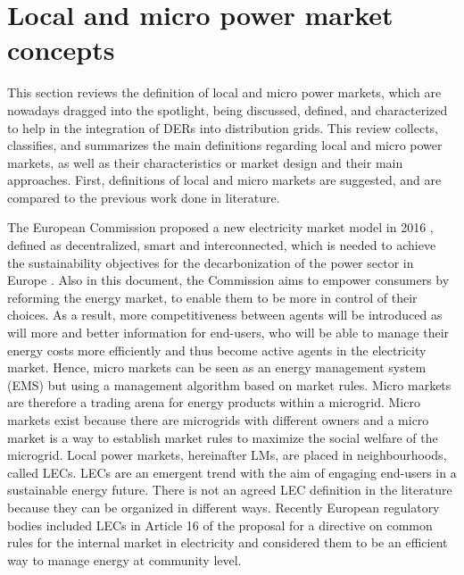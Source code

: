 \section{Local and micro power market concepts} \label{sec:localmicroconcepts}
This section reviews the definition of local and micro power markets, which are nowadays dragged into the spotlight, being discussed, defined, and characterized to help in the integration of DERs into distribution grids. This review collects, classifies, and summarizes the main definitions regarding local and micro power markets, as well as their characteristics or market design and their main approaches. First, definitions of local and micro markets are suggested, and are compared to the previous work done in literature.

The European Commission proposed a new electricity market model in 2016 \cite{validzic2017clean}, defined as decentralized, smart and interconnected, which is needed to achieve the sustainability objectives for the decarbonization of the power sector in Europe \cite{peng2017electricity}. Also in this document, the Commission aims to empower consumers by reforming the energy market, to enable them to be more in control of their choices. As a result, more competitiveness between agents will be introduced as will more and better information for end-users, who will be able to manage their energy costs more efficiently and thus become active agents in the electricity market.
Hence, micro markets can be seen as an energy management system (EMS) but using a management algorithm based on market rules. Micro markets are therefore a trading arena for energy products within a microgrid. Micro markets exist because there are microgrids with different owners and a micro market is a way to establish market rules to maximize the social welfare of the microgrid.
Local power markets, hereinafter LMs, are placed in neighbourhoods, called LECs. LECs are an emergent trend with the aim of engaging end-users in a sustainable energy future. There is not an agreed LEC definition in the literature because they can be organized in different ways. Recently European regulatory bodies included LECs in Article 16 of the proposal for a directive on common rules for the internal market in electricity \cite{validzic2017clean} and considered them to be an efficient way to manage energy at community level. 
